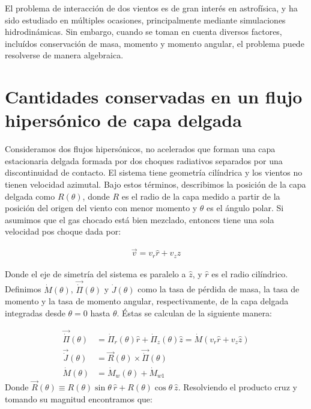 \label{chap:hipersonica}

El problema de interacción de dos vientos es de gran interés en astrofísica, y
ha sido estudiado en múltiples ocasiones, principalmente mediante simulaciones
hidrodinámicas. Sin embargo, cuando se toman en cuenta diversos factores, incluídos
conservación de masa, momento y momento angular, el problema puede resolverse de manera
algebraica.
\section{Cantidades conservadas en un flujo hipersónico de capa delgada}

Consideramos dos flujos hipersónicos, no acelerados que forman una capa estacionaria delgada
formada por dos choques radiativos separados por una discontinuidad de contacto. El sistema
tiene geometría cilíndrica y los vientos no tienen velocidad azimutal. Bajo estos términos,
describimos la posición de la capa delgada como $R(\theta)$, donde $R$ es el radio de la capa
medido a partir de la posición del origen del viento con menor momento y $\theta$ es el ángulo
polar. Si asumimos que el gas chocado está bien mezclado, entonces tiene una sola velocidad
pos choque dada por:

\begin{align}
  \vec{v} = v_r \hat{r} + v_z \hat{z}
\end{align}

Donde el eje de simetría del sistema es paralelo a $\hat{z}$, y $\hat{r}$ es el radio cilíndrico.
Definimos $\dot{M}(\theta)$, $\vec{\dot{\Pi}}(\theta)$ y $\dot{J}(\theta)$ como la tasa de pérdida
de masa, la tasa de momento y la tasa de momento angular, respectivamente, de la capa delgada
integradas desde $\theta=0$ hasta $\theta$. Éstas se calculan de la siguiente manera:

\begin{align}
  \vec{\dot{\Pi}}(\theta) &= \dot{\Pi}_r(\theta) \hat{r} + \dot{\Pi}_z(\theta) \hat{z} = \dot{M}\left(
                      v_r \hat{r} + v_z\hat{z}\right) \label{eq:dot-pi}\\
  \vec{\dot{J}}(\theta) &= \vec{R}(\theta) \times \vec{\dot{\Pi}}(\theta)  \\
  \dot{M}(\theta) &= \dot{M}_w(\theta) + \dot{M}_{w1} \label{eq:dot-M}
\end{align}
Donde $\vec{R}(\theta)\equiv R(\theta)\sin\theta~\hat{r} + R(\theta)\cos\theta~\hat{z}$. Resolviendo el producto
cruz y tomando su magnitud encontramos que:

